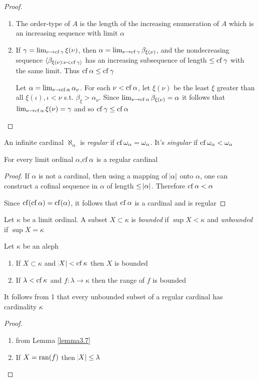 \documentclass[11pt]{article}
\begin{document}
\begin{proof}
\begin{enumerate}
\item The order-type of \(A\) is the length of the increasing enumeration of \(A\)
which is an increasing sequence with limit \(\alpha\)
\item If \(\gamma=\lim_{\nu\to\operatorname{cf}\gamma}\xi(\nu)\), then
\(\alpha=\lim_{\nu\to\operatorname{cf}\gamma}\beta_{\xi(\nu)}\), and the nondecreasing
sequence \(\langle\beta_{\xi(\nu):\nu<\operatorname{cf}\gamma\rangle}\) has an increasing
subsequence of length \(\le\operatorname{cf}\gamma\) with the same limit. Thus
\(\operatorname{cf}\alpha\le\operatorname{cf}\gamma\) 

Let \(\alpha=\lim_{\nu\to\operatorname{cf}\alpha}\alpha_\nu\). For each \(\nu<\operatorname{cf}\alpha\),
let \(\xi(\nu)\) be the least \(\xi\) greater than all \(\xi(\iota),\iota<\nu\)
s.t. \(\beta_\xi>\alpha_\nu\). Since
\(\lim_{\nu\to\operatorname{cf}\alpha}\beta_{\xi(\nu)}=\alpha\) it follows that
\(\lim_{\nu\to\operatorname{cf}\alpha}\xi(\nu)=\gamma\) and so \(\operatorname{cf}\gamma\le\operatorname{cf}\alpha\)
\end{enumerate}
\end{proof}

An infinite cardinal \(\aleph_\alpha\) is \emph{regular} if
\(\operatorname{cf}\omega_{\alpha}=\omega_\alpha\). It's \emph{singular} if
\(\operatorname{cf}\omega_\alpha<\omega_\alpha\)

\begin{lemma}[]
For every limit ordinal \(\alpha\),\(\operatorname{cf}\alpha\) is a regular cardinal
\end{lemma}
\begin{proof}
If \(\alpha\) is not a cardinal, then using a mapping of \(\abs{\alpha}\) onto
\(\alpha\), one can construct a cofinal sequence in \(\alpha\) of length
\(\le\abs{\alpha}\). Therefore \(\operatorname{cf}\alpha<\alpha\)

Since \(\operatorname{cf}(\operatorname{cf}\alpha)=\operatorname{cf}(\alpha)\), it follows that \(\operatorname{cf}\alpha\) is a cardinal
and is regular
\end{proof}

Let \(\kappa\) be a limit ordinal. A subset \(X\subset\kappa\) is \emph{bounded} if \(\sup
   X<\kappa\) and \emph{unbounded} if \(\sup X=\kappa\) 

\begin{lemma}[]
Let \(\kappa\) be an aleph
\begin{enumerate}
\item If \(X\subset\kappa\) and \(\abs{X}<\operatorname{cf}\kappa\) then \(X\) is bounded
\item If \(\lambda<\operatorname{cf}\kappa\) and \(f:\lambda\to\kappa\) then the range of \(f\) is
bounded
\end{enumerate}
\end{lemma}
It follows from 1 that every unbounded subset of a regular cardinal has
cardinality \(\kappa\)
\begin{proof}
\begin{enumerate}
\item from Lemma \ref{lemma3.7}
\item If \(X=\mathrm{ran}{(f)}\) then \(\abs{X}\le\lambda\)
\end{enumerate}
\end{proof}
\end{document}
